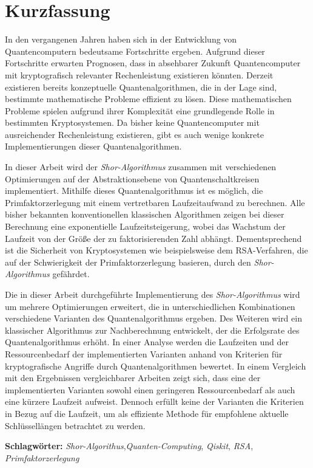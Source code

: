 
\section*{Kurzfassung}
In den vergangenen Jahren haben sich in der Entwicklung von Quantencomputern bedeutsame Fortschritte ergeben.
Aufgrund dieser Fortschritte erwarten Prognosen, 
dass in absehbarer Zukunft Quantencomputer mit kryptografisch relevanter Rechenleistung existieren könnten. 
Derzeit existieren bereits konzeptuelle Quantenalgorithmen, die in der Lage sind, 
bestimmte mathematische Probleme effizient zu lösen. 
Diese mathematischen Probleme spielen aufgrund ihrer Komplexität eine grundlegende Rolle in bestimmten Kryptosystemen. 
Da bisher keine Quantencomputer mit ausreichender Rechenleistung existieren, 
gibt es auch wenige konkrete Implementierungen dieser Quantenalgorithmen.

In dieser Arbeit wird der \textit{Shor-Algorithmus} zusammen mit verschiedenen Optimierungen 
auf der Abstraktionsebene von Quantenschaltkreisen implementiert.
Mithilfe dieses Quantenalgorithmus ist es möglich, 
die Primfaktorzerlegung mit einem vertretbaren Laufzeitaufwand zu berechnen. 
Alle bisher bekannten konventionellen klassischen Algorithmen zeigen bei dieser Berechnung eine exponentielle Laufzeitsteigerung, 
wobei das Wachstum der Laufzeit von der Größe der zu faktorisierenden Zahl abhängt.
Dementsprechend ist die Sicherheit von Kryptosystemen wie beispielsweise dem RSA-Verfahren, 
die auf der Schwierigkeit der Primfaktorzerlegung basieren, 
durch den \textit{Shor-Algorithmus} gefährdet.

Die in dieser Arbeit durchgeführte Implementierung des \textit{Shor-Algorithmus} 
wird um mehrere Optimierungen erweitert, 
die in unterschiedlichen Kombinationen verschiedene Varianten des Quantenalgorithmus ergeben.  
Des Weiteren wird ein klassischer Algorithmus zur Nachberechnung entwickelt, 
der die Erfolgsrate des Quantenalgorithmus erhöht. 
In einer Analyse werden die Laufzeiten und 
der Ressourcenbedarf der implementierten Varianten anhand von Kriterien für kryptografische Angriffe durch Quantenalgorithmen bewertet.
In einem Vergleich mit den Ergebnissen vergleichbarer Arbeiten zeigt sich, 
dass eine der implementierten Varianten sowohl einen geringeren Ressourcenbedarf als auch eine kürzere Laufzeit aufweist. 
Dennoch erfüllt keine der Varianten die Kriterien in Bezug auf die Laufzeit, 
um als effiziente Methode für empfohlene aktuelle Schlüssellängen betrachtet zu werden.

\textbf{Schlagwörter:} \textit{Shor-Algorithus},\textit{Quanten-Computing}, \textit{Qiskit}, \textit{RSA}, \textit{Primfaktorzerlegung}

